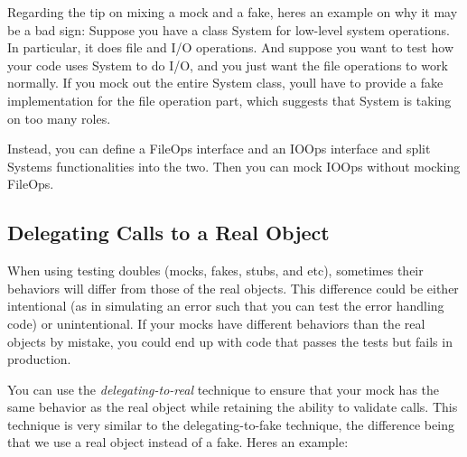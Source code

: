 Regarding the tip on mixing a mock and a fake, here\textquotesingle{}s an example on why it may be a bad sign\+: Suppose you have a class {\ttfamily System} for low-\/level system operations. In particular, it does file and I/O operations. And suppose you want to test how your code uses {\ttfamily System} to do I/O, and you just want the file operations to work normally. If you mock out the entire {\ttfamily System} class, you\textquotesingle{}ll have to provide a fake implementation for the file operation part, which suggests that {\ttfamily System} is taking on too many roles.

Instead, you can define a {\ttfamily File\+Ops} interface and an {\ttfamily I\+O\+Ops} interface and split {\ttfamily System}\textquotesingle{}s functionalities into the two. Then you can mock {\ttfamily I\+O\+Ops} without mocking {\ttfamily File\+Ops}.

\subsection*{Delegating Calls to a Real Object}

When using testing doubles (mocks, fakes, stubs, and etc), sometimes their behaviors will differ from those of the real objects. This difference could be either intentional (as in simulating an error such that you can test the error handling code) or unintentional. If your mocks have different behaviors than the real objects by mistake, you could end up with code that passes the tests but fails in production.

You can use the {\itshape delegating-\/to-\/real} technique to ensure that your mock has the same behavior as the real object while retaining the ability to validate calls. This technique is very similar to the delegating-\/to-\/fake technique, the difference being that we use a real object instead of a fake. Here\textquotesingle{}s an example\+:


\begin{DoxyCode}{0}
\DoxyCodeLine{}
\DoxyCodeLine{  \}}
\DoxyCodeLine{\};}
\DoxyCodeLine{}
\DoxyCodeLine{}
\end{DoxyCode}


